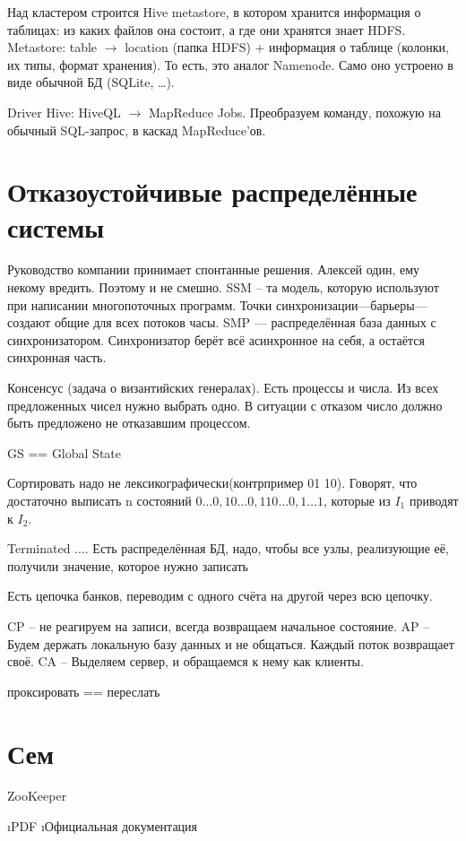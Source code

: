 Над кластером строится Hive metastore, в котором хранится информация о таблицах: из каких файлов она состоит, а где они хранятся знает HDFS.
Metastore: table $\rightarrow$ location (папка HDFS) + информация о таблице (колонки, их типы, формат хранения).
То есть, это аналог Namenode. Само оно устроено в виде обычной БД (SQLite, \dots).

Driver Hive: HiveQL $\rightarrow$ MapReduce Jobs.
Преобразуем команду, похожую на обычный SQL-запрос, в каскад MapReduce'ов.


\section{Отказоустойчивые распределённые системы}
Руководство компании принимает спонтанные решения.
Алексей один, ему некому вредить. Поэтому и не смешно.
SSM -- та модель, которую используют при написании многопоточных программ. Точки синхронизации---барьеры--- создают общие для всех потоков часы.
SMP --- распределённая база данных с синхронизатором. Синхронизатор берёт всё асинхронное на себя, а остаётся синхронная часть.

Консенсус (задача о византийских генералах). Есть процессы и числа. Из всех предложенных чисел нужно выбрать одно. В ситуации с отказом число должно быть предложено не отказавшим процессом. 

GS == Global State

Сортировать надо не лексикографически(контрпример 01 10). Говорят, что достаточно выписать n состояний $0\dots0, 10\dots0, 110\dots0, 1\dots1$, которые из $I_1$  приводят к $I_2$. 


Terminated  .... Есть распределённая БД, надо, чтобы все узлы, реализующие её, получили значение, которое нужно записать

Есть цепочка банков, переводим с одного счёта на другой через всю цепочку.

CP -- не реагируем на записи, всегда возвращаем начальное состояние. 
AP -- Будем держать локальную базу данных и не общаться. Каждый поток возвращает своё.
CA -- Выделяем сервер, и обращаемся к нему как клиенты.

проксировать == переслать


\section{Сем}
ZooKeeper
\begin{enumerate}
	\i PDF
	\i Официальная документация
\end{enumerate}

